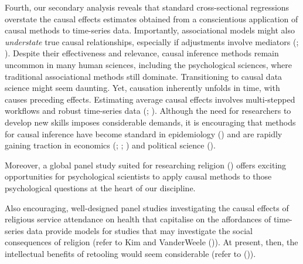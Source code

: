 \documentclass[
  single column]{article}
\begin{document}
Fourth, our secondary analysis reveals that standard cross-sectional
regressions overstate the causal effects estimates obtained from a
conscientious application of causal methods to time-series data.
Importantly, associational models might also \emph{understate} true
causal relationships, especially if adjustments involve mediators
(;
). Despite
their effectiveness and relevance, causal inference methods remain
uncommon in many human sciences, including the psychological sciences,
where traditional associational methods still dominate. Transitioning to
causal data science might seem daunting. Yet, causation inherently
unfolds in time, with causes preceding effects. Estimating average
causal effects involves multi-stepped workflows and robust time-series
data (;
). Although the need for
researchers to develop new skills imposes considerable demands, it is
encouraging that methods for causal inference have become standard in
epidemiology () and are
rapidly gaining traction in economics
(;
;
) and political science
().

Moreover, a global panel study suited for researching religion
() offers
exciting opportunities for psychological scientists to apply causal
methods to those psychological questions at the heart of our discipline.

Also encouraging, well-designed panel studies investigating the causal
effects of religious service attendance on health that capitalise on the
affordances of time-series data provide models for studies that may
investigate the social consequences of religion (refer to Kim and
VanderWeele ()). At present, then,
the intellectual benefits of retooling would seem considerable (refer to
()).
\end{document}

